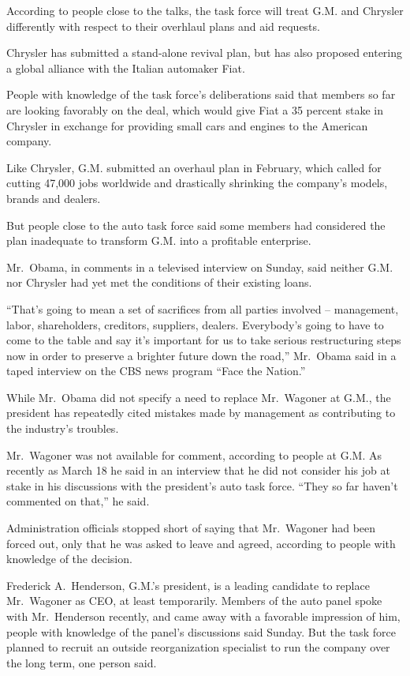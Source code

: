 \documentclass[12pt,a4paper,onecolumn]{article}
\begin{document}
According to people close to the talks, the task force will treat G.M. and Chrysler differently with
respect to their overhlaul plans and aid requests.

Chrysler has submitted a stand-alone revival plan, but has also proposed entering a global alliance
with the Italian automaker Fiat.

People with knowledge of the task force's deliberations said that members so far are looking
favorably on the deal, which would give Fiat a 35 percent stake in Chrysler in exchange for
providing small cars and engines to the American company.

Like Chrysler, G.M. submitted an overhaul plan in February, which called for cutting 47,000 jobs
worldwide and drastically shrinking the company's models, brands and dealers.

But people close to the auto task force said some members had considered the plan inadequate to
transform G.M. into a profitable enterprise.

Mr.~Obama, in comments in a televised interview on Sunday, said neither G.M. nor Chrysler had yet
met the conditions of their existing loans.

``That's going to mean a set of sacrifices from all parties involved -- management, labor,
shareholders, creditors, suppliers, dealers. Everybody's going to have to come to the table and say
it's important for us to take serious restructuring steps now in order to preserve a brighter future
down the road,'' Mr.~Obama said in a taped interview on the CBS news program ``Face the Nation.''

While Mr.~Obama did not specify a need to replace Mr.~Wagoner at G.M., the president has repeatedly
cited mistakes made by management as contributing to the industry's troubles.

Mr.~Wagoner was not available for comment, according to people at G.M. As recently as March 18 he
said in an interview that he did not consider his job at stake in his discussions with the
president's auto task force. ``They so far haven't commented on that,'' he said.

Administration officials stopped short of saying that Mr.~Wagoner had been forced out, only that he
was asked to leave and agreed, according to people with knowledge of the decision.

Frederick A.~Henderson, G.M.'s president, is a leading candidate to replace Mr.~Wagoner as CEO, at
least temporarily. Members of the auto panel spoke with Mr.~Henderson recently, and came away with a
favorable impression of him, people with knowledge of the panel's discussions said Sunday. But the
task force planned to recruit an outside reorganization specialist to run the company over the long
term, one person said.
\end{document}
